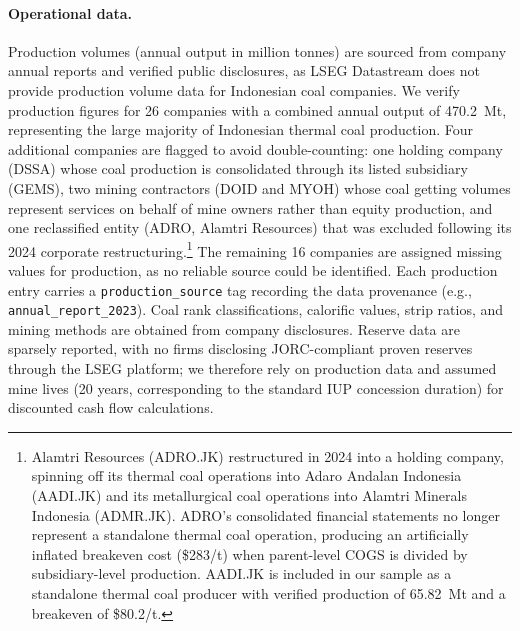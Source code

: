 \paragraph{Operational data.} Production volumes (annual output in million tonnes) are sourced from company annual reports and verified public disclosures, as LSEG Datastream does not provide production volume data for Indonesian coal companies. We verify production figures for 26 companies with a combined annual output of 470.2~Mt, representing the large majority of Indonesian thermal coal production. Four additional companies are flagged to avoid double-counting: one holding company (DSSA) whose coal production is consolidated through its listed subsidiary (GEMS), two mining contractors (DOID and MYOH) whose coal getting volumes represent services on behalf of mine owners rather than equity production, and one reclassified entity (ADRO, Alamtri Resources) that was excluded following its 2024 corporate restructuring.\footnote{Alamtri Resources (ADRO.JK) restructured in 2024 into a holding company, spinning off its thermal coal operations into Adaro Andalan Indonesia (AADI.JK) and its metallurgical coal operations into Alamtri Minerals Indonesia (ADMR.JK). ADRO's consolidated financial statements no longer represent a standalone thermal coal operation, producing an artificially inflated breakeven cost (\$283/t) when parent-level COGS is divided by subsidiary-level production. AADI.JK is included in our sample as a standalone thermal coal producer with verified production of 65.82~Mt and a breakeven of \$80.2/t.} The remaining 16 companies are assigned missing values for production, as no reliable source could be identified. Each production entry carries a \texttt{production\_source} tag recording the data provenance (e.g., \texttt{annual\_report\_2023}). Coal rank classifications, calorific values, strip ratios, and mining methods are obtained from company disclosures. Reserve data are sparsely reported, with no firms disclosing JORC-compliant proven reserves through the LSEG platform; we therefore rely on production data and assumed mine lives (20 years, corresponding to the standard IUP concession duration) for discounted cash flow calculations.


